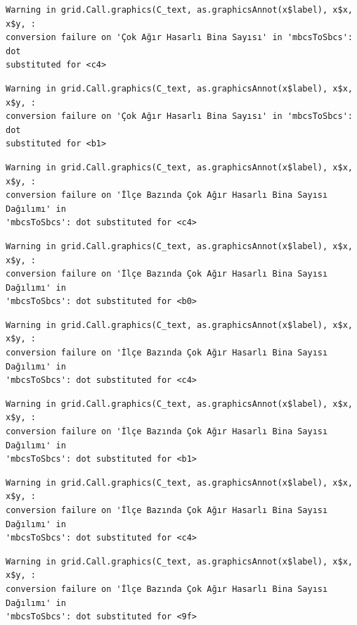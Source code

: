 \documentclass[
  11pt,
  a4paper,
  DIV=11,
  numbers=noendperiod]{scrartcl}
\begin{document}
\begin{verbatim}
Warning in grid.Call.graphics(C_text, as.graphicsAnnot(x$label), x$x, x$y, :
conversion failure on 'Çok Ağır Hasarlı Bina Sayısı' in 'mbcsToSbcs': dot
substituted for <c4>
\end{verbatim}

\begin{verbatim}
Warning in grid.Call.graphics(C_text, as.graphicsAnnot(x$label), x$x, x$y, :
conversion failure on 'Çok Ağır Hasarlı Bina Sayısı' in 'mbcsToSbcs': dot
substituted for <b1>
\end{verbatim}

\begin{verbatim}
Warning in grid.Call.graphics(C_text, as.graphicsAnnot(x$label), x$x, x$y, :
conversion failure on 'İlçe Bazında Çok Ağır Hasarlı Bina Sayısı Dağılımı' in
'mbcsToSbcs': dot substituted for <c4>
\end{verbatim}

\begin{verbatim}
Warning in grid.Call.graphics(C_text, as.graphicsAnnot(x$label), x$x, x$y, :
conversion failure on 'İlçe Bazında Çok Ağır Hasarlı Bina Sayısı Dağılımı' in
'mbcsToSbcs': dot substituted for <b0>
\end{verbatim}

\begin{verbatim}
Warning in grid.Call.graphics(C_text, as.graphicsAnnot(x$label), x$x, x$y, :
conversion failure on 'İlçe Bazında Çok Ağır Hasarlı Bina Sayısı Dağılımı' in
'mbcsToSbcs': dot substituted for <c4>
\end{verbatim}

\begin{verbatim}
Warning in grid.Call.graphics(C_text, as.graphicsAnnot(x$label), x$x, x$y, :
conversion failure on 'İlçe Bazında Çok Ağır Hasarlı Bina Sayısı Dağılımı' in
'mbcsToSbcs': dot substituted for <b1>
\end{verbatim}

\begin{verbatim}
Warning in grid.Call.graphics(C_text, as.graphicsAnnot(x$label), x$x, x$y, :
conversion failure on 'İlçe Bazında Çok Ağır Hasarlı Bina Sayısı Dağılımı' in
'mbcsToSbcs': dot substituted for <c4>
\end{verbatim}

\begin{verbatim}
Warning in grid.Call.graphics(C_text, as.graphicsAnnot(x$label), x$x, x$y, :
conversion failure on 'İlçe Bazında Çok Ağır Hasarlı Bina Sayısı Dağılımı' in
'mbcsToSbcs': dot substituted for <9f>
\end{verbatim}
\end{document}
